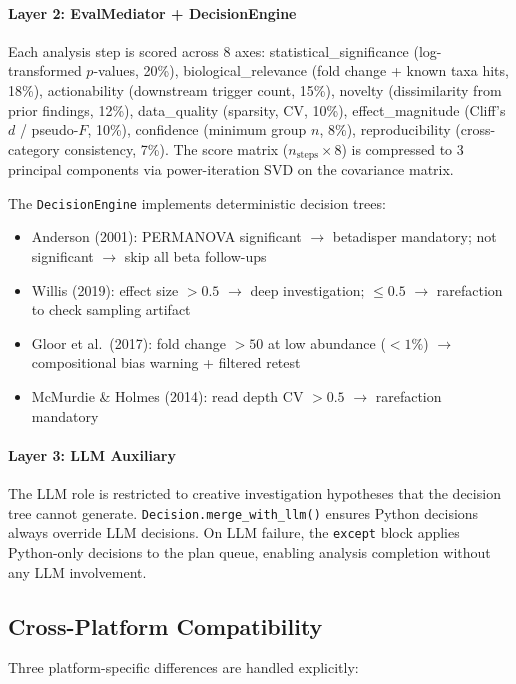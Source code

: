 \documentclass[12pt, a4paper]{article}
\begin{document}
\paragraph{Layer 2: EvalMediator + DecisionEngine}
Each analysis step is scored across 8 axes:
statistical\_significance (log-transformed $p$-values, 20\%),
biological\_relevance (fold change + known taxa hits, 18\%),
actionability (downstream trigger count, 15\%),
novelty (dissimilarity from prior findings, 12\%),
data\_quality (sparsity, CV, 10\%),
effect\_magnitude (Cliff's $d$ / pseudo-$F$, 10\%),
confidence (minimum group $n$, 8\%),
reproducibility (cross-category consistency, 7\%).
The score matrix ($n_{\text{steps}} \times 8$) is compressed to 3 principal components
via power-iteration SVD on the covariance matrix.

The \texttt{DecisionEngine} implements deterministic decision trees:
\begin{itemize}
  \item Anderson (2001): PERMANOVA significant $\rightarrow$ betadisper mandatory; not significant $\rightarrow$ skip all beta follow-ups
  \item Willis (2019): effect size $> 0.5$ $\rightarrow$ deep investigation; $\leq 0.5$ $\rightarrow$ rarefaction to check sampling artifact
  \item Gloor et al.\ (2017): fold change $> 50$ at low abundance ($< 1\%$) $\rightarrow$ compositional bias warning + filtered retest
  \item McMurdie \& Holmes (2014): read depth CV $> 0.5$ $\rightarrow$ rarefaction mandatory
\end{itemize}

\paragraph{Layer 3: LLM Auxiliary}
The LLM role is restricted to creative investigation hypotheses that the decision tree
cannot generate. \texttt{Decision.merge\_with\_llm()} ensures Python decisions always
override LLM decisions. On LLM failure, the \texttt{except} block applies Python-only
decisions to the plan queue, enabling analysis completion without any LLM involvement.

\subsection{Cross-Platform Compatibility}

Three platform-specific differences are handled explicitly:
\end{document}

